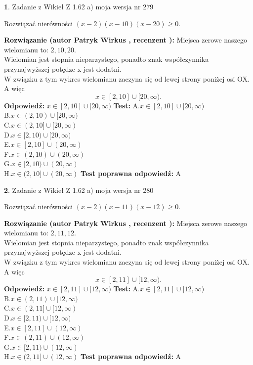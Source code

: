 \documentclass[12pt, a4paper]{article}
\theoremstyle{definition} %
\newtheorem{zad}{}
\newcommand{\zadStart}[1]{\begin{zad}#1\newline}
\newcommand{\zadStop}{\end{zad}}
\newcommand{\rozwStart}[2]{\noindent \textbf{Rozwiązanie (autor #1 , recenzent #2): }\newline}
\newcommand{\rozwStop}{\newline}
\newcommand{\odpStart}{\noindent \textbf{Odpowiedź:}\newline}
\newcommand{\odpStop}{\newline}
\newcommand{\testStart}{\noindent \textbf{Test:}\newline}
\newcommand{\testStop}{\newline}
\newcommand{\kluczStart}{\noindent \textbf{Test poprawna odpowiedź:}\newline}
\newcommand{\kluczStop}{\newline}
\begin{document}
\zadStart{Zadanie z Wikieł Z 1.62 a) moja wersja nr 279}

Rozwiązać nierówności $(x-2)(x-10)(x-20)\ge0$.
\zadStop
\rozwStart{Patryk Wirkus}{}
Miejsca zerowe naszego wielomianu to: $2, 10, 20$.\\
Wielomian jest stopnia nieparzystego, ponadto znak współczynnika przy\linebreak najwyższej potędze x jest dodatni.\\ W związku z tym wykres wielomianu zaczyna się od lewej strony poniżej osi OX. A więc $$x \in [2,10] \cup [20,\infty).$$
\rozwStop
\odpStart
$x \in [2,10] \cup [20,\infty)$
\odpStop
\testStart
A.$x \in [2,10] \cup [20,\infty)$\\
B.$x \in (2,10) \cup [20,\infty)$\\
C.$x \in (2,10] \cup [20,\infty)$\\
D.$x \in [2,10) \cup [20,\infty)$\\
E.$x \in [2,10] \cup (20,\infty)$\\
F.$x \in (2,10) \cup (20,\infty)$\\
G.$x \in [2,10) \cup (20,\infty)$\\
H.$x \in (2,10] \cup (20,\infty)$
\testStop
\kluczStart
A
\kluczStop



\zadStart{Zadanie z Wikieł Z 1.62 a) moja wersja nr 280}

Rozwiązać nierówności $(x-2)(x-11)(x-12)\ge0$.
\zadStop
\rozwStart{Patryk Wirkus}{}
Miejsca zerowe naszego wielomianu to: $2, 11, 12$.\\
Wielomian jest stopnia nieparzystego, ponadto znak współczynnika przy\linebreak najwyższej potędze x jest dodatni.\\ W związku z tym wykres wielomianu zaczyna się od lewej strony poniżej osi OX. A więc $$x \in [2,11] \cup [12,\infty).$$
\rozwStop
\odpStart
$x \in [2,11] \cup [12,\infty)$
\odpStop
\testStart
A.$x \in [2,11] \cup [12,\infty)$\\
B.$x \in (2,11) \cup [12,\infty)$\\
C.$x \in (2,11] \cup [12,\infty)$\\
D.$x \in [2,11) \cup [12,\infty)$\\
E.$x \in [2,11] \cup (12,\infty)$\\
F.$x \in (2,11) \cup (12,\infty)$\\
G.$x \in [2,11) \cup (12,\infty)$\\
H.$x \in (2,11] \cup (12,\infty)$
\testStop
\kluczStart
A
\kluczStop
\end{document}
